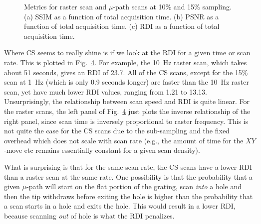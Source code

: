 \documentclass[twocolumn,oneside]{IEEEtran/IEEEtran}
\begin{document}
\begin{figure}[h!]
  \begin{subfigure}{0.33\textwidth}
    
    \caption{}
    \label{fig:time_ssim}
  \end{subfigure}
  \begin{subfigure}{0.33\textwidth}
    
    \caption{}
    \label{fig:time_psnr}
  \end{subfigure}
  \begin{subfigure}{0.33\textwidth}
    
    \caption{}
    \label{fig:time_damage}
  \end{subfigure}
\caption{Metrics for raster scan and $\mu$-path scans at 10\% and 15\% sampling. (a) SSIM as a function of total acquisition time. (b) PSNR  as a function of total acquisition time. (c) RDI as a function of total acquisition time.}
    
\end{figure}

Where CS seems to really shine is if we look at the RDI for a given time or scan
rate. This is plotted in Fig.~\ref{fig:time_damage}. For example, the 10~Hz
raster scan, which takes about 51 seconds, gives an RDI of 23.7. All of the CS
scans, except for the 15\% scan at 1~Hz (which is only 0.9 seconds longer) are
faster than the 10~Hz raster scan, yet have much lower RDI values, ranging from
1.21 to 13.13. Unsurprisingly, the relationship between scan speed and RDI is
quite linear. For the raster scans, the left panel of Fig.~\ref{fig:time_damage}
just plots the inverse relationship of the right panel, since scan time is
inversely proportional to raster frequency. This is not quite the case for the
CS scans due to the sub-sampling and the fixed overhead which does not scale
with scan rate (e.g., the amount of time for the $XY$-move etc remains
essentially constant for a given scan density).

What is surprising is that for the same scan rate, the CS scans have a lower RDI
than a raster scan at the same rate. One possibility is that the probability
that a given $\mu$-path will start on the flat portion of the grating, scan
\textit{into} a hole and then the tip withdraws before exiting the hole is
higher than the probability that a scan starts in a hole and exits the hole.
This would result in a lower RDI, because scanning \textit{out} of hole is what
the RDI penalizes.
\end{document}
